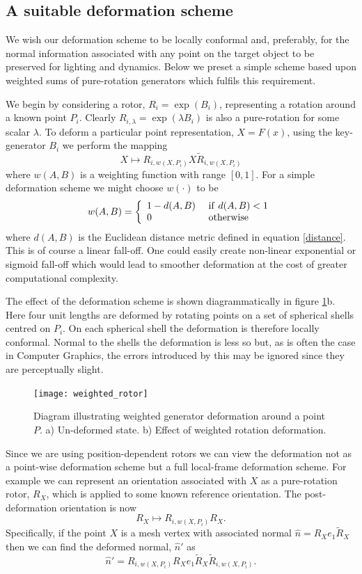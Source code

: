 \subsection{A suitable deformation scheme}

We wish our deformation scheme to be locally conformal and, preferably, for the
normal information associated with any point on the target object to be preserved
for lighting and dynamics. Below we preset a simple scheme based upon weighted sums
of pure-rotation generators which fulfils this requirement.

We begin by considering a rotor, $R_i = \exp(B_i)$, representing a rotation around a 
known point $P_i$. Clearly $R_{i,\lambda} = \exp(\lambda B_i)$ is also a pure-rotation
for some scalar $\lambda$. To deform a particular
point representation, $X = F(x)$, using the key-generator $B_i$ we perform the mapping
\[
X \mapsto R_{i,w(X,P_i)}X\tilde{R}_{i,w(X,P_i)}
\]
where $w(A,B)$ is a weighting function with range $[0,1]$. For a simple deformation
scheme we might choose $w(\cdot)$ to be
\[
w(A,B) = \left\{
  \begin{array}{ll}
  1 - d(A,B) &{\rm ~if~} d(A,B) < 1\\
          0 & {\rm ~otherwise}
  \end{array}
  \right.
\]
where $d(A,B)$ is the Euclidean distance metric defined in equation \ref{distance}.
This is of course a linear fall-off. One could easily create non-linear exponential
or sigmoid fall-off which would lead to smoother deformation at the cost of greater
computational complexity.

The effect of the deformation scheme is shown diagrammatically in figure
\ref{fig:weighted_rotor}b. Here four unit lengths are deformed by rotating points
on a set of spherical shells centred on $P_i$. On each spherical shell the deformation
is therefore locally conformal. Normal to the shells the deformation is less so but,
as is often the case in Computer Graphics, the errors introduced by this
may be ignored since they are perceptually slight.

\begin{figure}
\centering
\texttt{[image: weighted\_rotor]}
\caption{\label{fig:weighted_rotor}%
  Diagram illustrating weighted generator deformation around a point $P$. 
          a) Un-deformed state. b) Effect of weighted rotation deformation.
}
\end{figure}

Since we are using position-dependent rotors we can view the deformation not as a point-wise 
deformation scheme but a full local-frame deformation scheme. For example we can represent an
orientation associated with $X$ as a pure-rotation rotor, $R_X$, which is applied to some known
reference orientation. The post-deformation orientation is now
\[
R_X \mapsto R_{i,w(X,P_i)}R_X.
\]
Specifically, if the point $X$ is a mesh vertex with associated normal
$\hat{n} = R_Xe_1\tilde{R}_X$ then we can find the deformed normal, $\hat{n}'$ as
\[
\hat{n}' = R_{i,w(X,P_i)}R_Xe_1\tilde{R}_X\tilde{R}_{i,w(X,P_i)}.
\]

